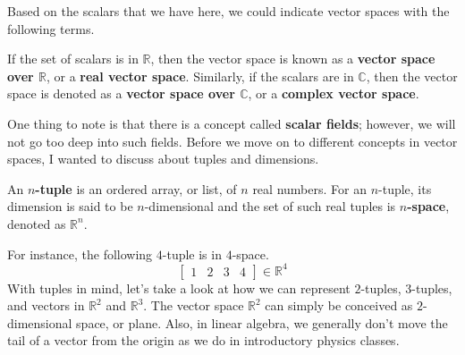 \documentclass[../main.tex]{subfiles}
\begin{document}
Based on the scalars that we have here, we could indicate vector
spaces with the following terms.

\begin{definition}{}{}
If the set of scalars is in $\mathbb{R}$, then the vector space
is known as a \textbf{vector space over $\mathbb{R}$}, or a
\textbf{real vector space}. Similarly, if the scalars are in
$\mathbb{C}$, then the vector space is denoted as a
\textbf{vector space over $\mathbb{C}$}, or a \textbf{complex vector
space}.
\end{definition}

One thing to note is that there is a concept called \textbf{scalar
fields}; however, we will not go too deep into such fields.
Before we move on to different concepts in vector spaces, I wanted
to discuss about tuples and dimensions.

\begin{definition}{}{}
An \textbf{$n$-tuple} is an ordered array, or list, of $n$ real
numbers. For an $n$-tuple, its dimension is said to be $n$-dimensional
and the set of such real tuples is \textbf{$n$-space}, denoted as
$\mathbb{R}^n$.
\end{definition}

For instance, the following $4$-tuple is in $4$-space.
\[
\begin{bmatrix}
    1 & 2 & 3 & 4
\end{bmatrix}
\in
\mathbb{R}^4
\]
With tuples in mind, let's take a look at how we can represent
$2$-tuples, $3$-tuples, and vectors in $\mathbb{R}^2$ and
$\mathbb{R}^3$. The vector space $\mathbb{R}^2$ can simply be
conceived as $2$-dimensional space, or plane. Also, in linear
algebra, we generally don't move the tail of a vector from the origin
as we do in introductory physics classes.

\begin{figure}[H]
\centering
{}
\end{figure}
\end{document}
